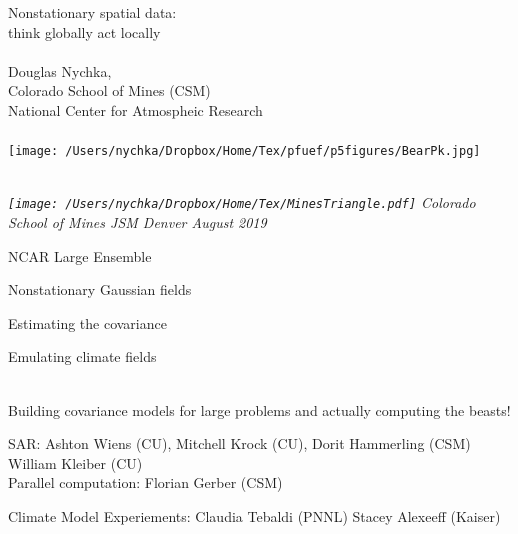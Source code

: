 \documentclass[bgimage]{/Users/nychka/Dropbox/Home/Tex/pfuef/pfuef}
\def\Myheading#1{{\color{black}{\it  \bf {\large  #1}}}}
\begin{document}
\slide{}
\vspace*{-.5in}
{ \Huge
Nonstationary spatial data: \\
 think globally act locally
 } 
%
\\ \\
%
{\color{black}
{\Large  Douglas Nychka}, \\
Colorado School of Mines  (CSM) \\
National Center for Atmospheic Research
} 
\\ \\
\hspace*{.75in}
\texttt{[image: /Users/nychka/Dropbox/Home/Tex/pfuef/p5figures/BearPk.jpg]}
\\
\\
\colorbox{grey90}{
\begin{minipage}{ 10in} {\normalsize \it
\texttt{[image: /Users/nychka/Dropbox/Home/Tex/MinesTriangle.pdf]}  Colorado School of Mines  \hfill {\it 
 JSM Denver August 2019 }
}
\end{minipage}
}

\clearpage \setcounter{page}{1}
\begin{ilist}
\item NCAR Large Ensemble        
\item Nonstationary Gaussian fields 
\item Estimating the covariance 
\item Emulating climate fields
\end{ilist}
 
\Myheading{Challenges:}   \\
Building covariance models for large problems and actually computing the beasts!

\bdot SAR: 
Ashton Wiens (CU), Mitchell Krock (CU), Dorit Hammerling (CSM) William Kleiber (CU)\\
 
\bdot Parallel computation: Florian Gerber (CSM) 

\bdot Climate Model Experiements: Claudia Tebaldi (PNNL)  Stacey Alexeeff (Kaiser) 
\end{document}
